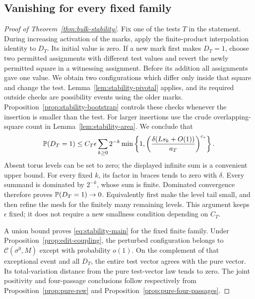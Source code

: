 \subsection{Vanishing for every fixed family}

\begin{proof}[Proof of Theorem~\ref{thm:bulk-stability}]
Fix one of the tests $T$ in the statement.  During increasing
activation of the marks, apply the finite-product interpolation
identity to $D_T$.  Its initial value is zero.  If a new mark
first makes $D_T=1$, choose two permitted assignments with
different test values and revert the newly permitted square
in a witnessing assignment.  Before its addition all
assignments gave one value.  We obtain two configurations
which differ only inside that square and change the test.
Lemma~\ref{lem:stability-pivotal} applies, and its required
outside checks are possibility events using the older marks.
Proposition~\ref{prop:stability-bootstrap} controls these
checks whenever the insertion is smaller than the test.
For larger insertions use the crude overlapping-square count
in Lemma~\ref{lem:stability-area}.  We conclude that
\begin{equation}
 \P(D_T=1)\leq C_T\epsilon
       \sum_{k\geq0}2^{-k}
       \min\left\{1,
          \left(\frac{\delta(Ls_k+O(1))}{a_T}\right)^{c_*}\right\}.
 \label{eq:stability-final-sum}
\end{equation}
Absent torus levels can be set to zero; the displayed
infinite sum is a convenient upper bound.  For every fixed
$k$, its factor in braces tends to zero with $\delta$.
Every summand is dominated by $2^{-k}$, whose sum is finite.
Dominated convergence therefore proves $\P(D_T=1)\to0$.
Equivalently first make the level tail small, and then refine
the mesh for the finitely many remaining levels.  This
argument keeps $\epsilon$ fixed; it does not require a new
smallness condition depending on $C_T$.

A union bound proves \eqref{eq:stability-main} for the fixed
finite family.  Under Proposition~\ref{prop:edit-coupling},
the perturbed configuration belongs to
$\mathcal C(\sigma^0,M)$ except with probability $o(1)$.
On the complement of that exceptional event and all $D_T$,
the entire test vector agrees with the pure vector.  Its
total-variation distance from the pure test-vector law tends
to zero.  The joint positivity and four-passage conclusions
follow respectively from Proposition~\ref{prop:pure-rsw}
and Proposition~\ref{prop:pure-four-passages}.
\end{proof}

